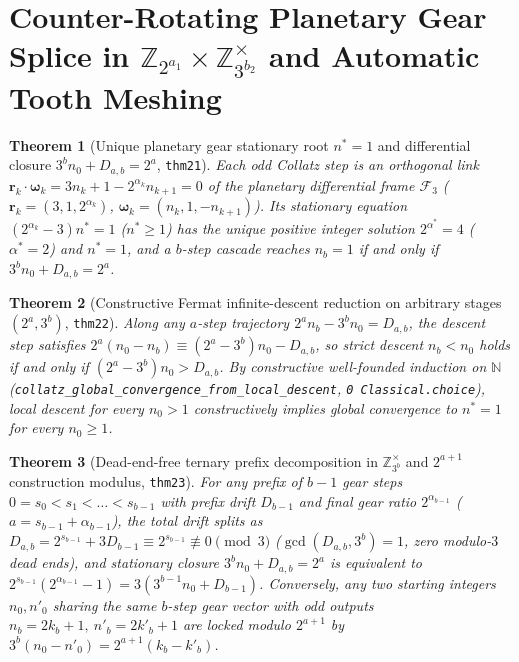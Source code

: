 \documentclass[11pt,a4paper]{article}
\newtheorem{theorem}{Theorem}[section]
\theoremstyle{definition}
\theoremstyle{remark}
\begin{document}
\section{Counter-Rotating Planetary Gear Splice in $\mathbb{Z}_{2^{a_1}} \times \mathbb{Z}_{3^{b_2}}^\times$ and Automatic Tooth Meshing}
\label{sec:planetary-splice}

\begin{theorem}[Unique planetary gear stationary root $n^* = 1$ and differential closure $3^b n_0 + D_{a,b} = 2^a$, \texttt{thm21}]
\label{thm:planetary-stationary-point}
Each odd Collatz step is an orthogonal link $\mathbf{r}_k \cdot \mathbf{\omega}_k = 3 n_k + 1 - 2^{\alpha_k} n_{k+1} = 0$ of the planetary differential frame $\mathcal{F}_3$ ($\mathbf{r}_k = (3, 1, 2^{\alpha_k})$, $\mathbf{\omega}_k = (n_k, 1, -n_{k+1})$). Its stationary equation $(2^{\alpha_k} - 3) n^* = 1$ ($n^* \ge 1$) has the unique positive integer solution $2^{\alpha^*} = 4$ ($\alpha^* = 2$) and $n^* = 1$, and a $b$-step cascade reaches $n_b = 1$ if and only if $3^b n_0 + D_{a,b} = 2^a$.
\end{theorem}

\begin{theorem}[Constructive Fermat infinite-descent reduction on arbitrary stages $(2^a, 3^b)$, \texttt{thm22}]
\label{thm:fermat-descent-reduction}
Along any $a$-step trajectory $2^a n_b - 3^b n_0 = D_{a,b}$, the descent step satisfies $2^a(n_0 - n_b) \equiv (2^a - 3^b) n_0 - D_{a,b}$, so strict descent $n_b < n_0$ holds if and only if $(2^a - 3^b) n_0 > D_{a,b}$. By constructive well-founded induction on $\mathbb{N}$ (\texttt{collatz\_global\_convergence\_from\_local\_descent}, \texttt{0 Classical.choice}), local descent for every $n_0 > 1$ constructively implies global convergence to $n^* = 1$ for every $n_0 \ge 1$.
\end{theorem}

\begin{theorem}[Dead-end-free ternary prefix decomposition in $\mathbb{Z}_{3^b}^\times$ and $2^{a+1}$ construction modulus, \texttt{thm23}]
\label{thm:ternary-prefix-closure}
For any prefix of $b - 1$ gear steps $0 = s_0 < s_1 < \dots < s_{b-1}$ with prefix drift $D_{b-1}$ and final gear ratio $2^{\alpha_{b-1}}$ ($a = s_{b-1} + \alpha_{b-1}$), the total drift splits as $D_{a,b} = 2^{s_{b-1}} + 3 D_{b-1} \equiv 2^{s_{b-1}} \not\equiv 0 \pmod 3$ ($\gcd(D_{a,b}, 3^b) = 1$, zero modulo-$3$ dead ends), and stationary closure $3^b n_0 + D_{a,b} = 2^a$ is equivalent to $2^{s_{b-1}}(2^{\alpha_{b-1}} - 1) = 3(3^{b-1} n_0 + D_{b-1})$. Conversely, any two starting integers $n_0, n'_0$ sharing the same $b$-step gear vector with odd outputs $n_b = 2 k_b + 1,\ n'_b = 2 k'_b + 1$ are locked modulo $2^{a+1}$ by $3^b(n_0 - n'_0) = 2^{a+1}(k_b - k'_b)$.
\end{theorem}
\end{document}
